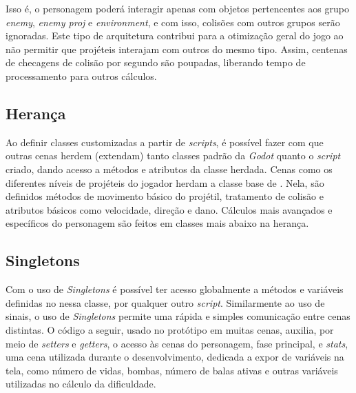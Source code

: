 Isso é, o personagem poderá interagir apenas com objetos pertencentes aos grupo \textit{enemy}, \textit{enemy proj} e \textit{environment}, e com isso, colisões com outros grupos serão ignoradas. Este tipo de arquitetura contribui para a otimização geral do jogo ao não permitir que projéteis interajam com outros do mesmo tipo. Assim, centenas de checagens de colisão por segundo são poupadas, liberando tempo de processamento para outros cálculos.

\subsection{Herança}

Ao definir classes customizadas a partir de \textit{scripts}, é possível fazer com que outras cenas herdem (extendam) tanto classes padrão da \textit{Godot} quanto o \textit{script} criado, dando acesso a métodos e atributos da classe herdada. Cenas como os diferentes níveis de projéteis do jogador herdam a classe base de \textquotedbl{}. Nela, são definidos métodos de movimento básico do projétil, tratamento de colisão e atributos básicos como velocidade, direção e dano. Cálculos mais avançados e específicos do personagem são feitos em classes mais abaixo na herança.

\subsection{Singletons}\label{sec:Singletons}

Com o uso de \textit{Singletons} é possível ter acesso globalmente a métodos e variáveis definidas no nessa classe, por qualquer outro \textit{script}. Similarmente ao uso de sinais, o uso de \textit{Singletons} permite uma rápida e simples comunicação entre cenas distintas. O código a seguir, usado no protótipo em muitas cenas, auxilia, por meio de \textit{setters} e \textit{getters}, o acesso às cenas do personagem, fase principal, e \textit{stats}, uma cena utilizada durante o desenvolvimento, dedicada a expor de variáveis na tela, como número de vidas, bombas, número de balas ativas e outras variáveis utilizadas no cálculo da dificuldade.

\pagebreak

